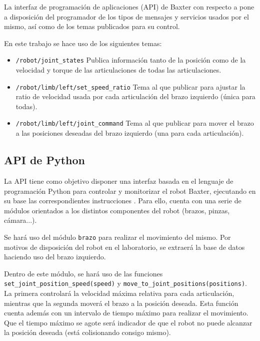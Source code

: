 La interfaz de programación de aplicaciones (API) de Baxter con respecto a \ros pone a disposición del programador de los tipos de mensajes y servicios usados por el mismo, así como de los temas publicados para su control.

En este trabajo se hace uso de los siguientes temas:

\begin{itemize}
\item \texttt{/robot/joint\_states} Publica información tanto de la posición como de la velocidad y torque de las articulaciones de todas las articulaciones.
\item \texttt{/robot/limb/left/set\_speed\_ratio} Tema al que publicar para ajustar la ratio de velocidad usada por cada articulación del brazo izquierdo (única para todas).
\item \texttt{/robot/limb/left/joint\_command} Tema al que publicar para mover el brazo a las posiciones deseadas del brazo izquierdo (una para cada articulación).
\end{itemize}

\subsection{API de Python}
\label{subsubsec:metodos/pythonAPI}
La API tiene como objetivo disponer una interfaz basada en el lenguaje de programación Python para controlar y monitorizar el robot Baxter, ejecutando en su base las correspondientes instrucciones \ros. Para ello, cuenta con una serie de módulos orientados a los distintos componentes del robot (brazos, pinzas, cámara...).

Se hará uso del módulo \texttt{brazo} para realizar el movimiento del mismo. Por motivos de disposición del robot en el laboratorio, se extraerá la base de datos haciendo uso del brazo izquierdo.

\begin{sloppypar}
Dentro de este módulo, se hará uso de las funciones \texttt{set\_joint\_position\_speed(speed)} y \texttt{move\_to\_joint\_positions(positions)}. La primera controlará la velocidad máxima relativa para cada articulación, mientras que la segunda moverá el brazo a la posición deseada. Esta función cuenta además con un intervalo de tiempo máximo para realizar el movimiento. Que el tiempo máximo se agote será indicador de que el robot no puede alcanzar la posición deseada (está colisionando consigo mismo).
\end{sloppypar}

